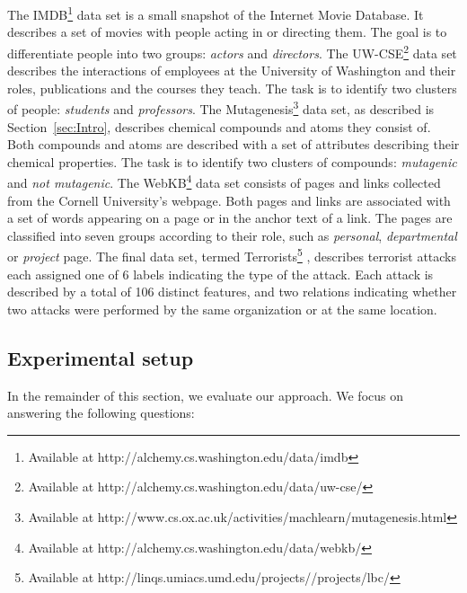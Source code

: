 The IMDB\footnote{Available at http://alchemy.cs.washington.edu/data/imdb} data set is a small snapshot of the Internet Movie Database.
It describes a set of movies with people acting in or directing them.
The goal is to differentiate people into two groups: \textit{actors} and \textit{directors}.
The UW-CSE\footnote{Available at http://alchemy.cs.washington.edu/data/uw-cse/} data set describes the interactions of employees at the University of Washington and their roles, publications and the courses they teach.
The task is to identify two clusters of people: \textit{students} and \textit{professors}.
The Mutagenesis\footnote{Available at http://www.cs.ox.ac.uk/activities/machlearn/mutagenesis.html} data set, as described is Section~\ref{sec:Intro}, describes chemical compounds and atoms they consist of. 
Both compounds and atoms are described with a set of attributes describing their chemical properties.
The task is to identify two clusters of compounds: \textit{mutagenic} and \textit{not mutagenic}.
The WebKB\footnote{Available at http://alchemy.cs.washington.edu/data/webkb/} data set consists of pages and links collected from the Cornell University's webpage.
Both pages and links are associated with a set of words appearing on a page or in the anchor text of a link.
The pages are classified into seven groups according to their role, such as \textit{personal}, \textit{departmental} or \textit{project} page.
The final data set, termed Terrorists\footnote{Available at http://linqs.umiacs.umd.edu/projects//projects/lbc/} \cite{sen:aimag08}, describes terrorist attacks each assigned one of 6 labels indicating the type of the attack.
Each attack is described by a total of 106 distinct features, and two relations indicating whether two attacks were performed by the same organization or at the same location.



\subsection{Experimental setup}

In the remainder of this section, we evaluate our approach.
We focus on answering the following questions:

